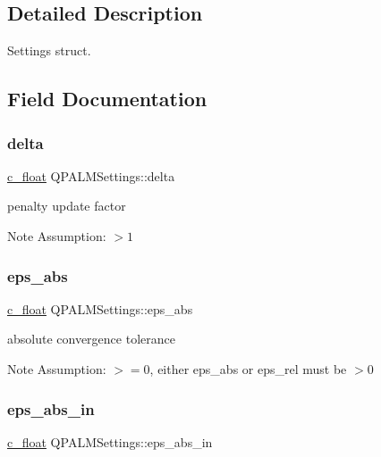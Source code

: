 \subsection{Detailed Description}
Settings struct. 

\subsection{Field Documentation}
\mbox{\label{structQPALMSettings_a1bf9e088b59e076c100ce03da4431181}} 
\subsubsection{\texorpdfstring{delta}{delta}}
{\footnotesize\ttfamily \mbox{\hyperlink{global__opts_8h_a7f1a9fda95e52979658c20a0d134fb15}{c\+\_\+float}} Q\+P\+A\+L\+M\+Settings\+::delta}



penalty update factor 

\begin{DoxyNote}{Note}
Assumption\+: $>1$ 
\end{DoxyNote}
\mbox{\label{structQPALMSettings_adadd5ae5aada22693f708c55678777f4}} 
\subsubsection{\texorpdfstring{eps\_abs}{eps\_abs}}
{\footnotesize\ttfamily \mbox{\hyperlink{global__opts_8h_a7f1a9fda95e52979658c20a0d134fb15}{c\+\_\+float}} Q\+P\+A\+L\+M\+Settings\+::eps\+\_\+abs}



absolute convergence tolerance 

\begin{DoxyNote}{Note}
Assumption\+: $>=0$, either eps\+\_\+abs or eps\+\_\+rel must be $>0$ 
\end{DoxyNote}
\mbox{\label{structQPALMSettings_a0b5e66e45976754edbefb12c9aa6cd4d}} 
\subsubsection{\texorpdfstring{eps\_abs\_in}{eps\_abs\_in}}
{\footnotesize\ttfamily \mbox{\hyperlink{global__opts_8h_a7f1a9fda95e52979658c20a0d134fb15}{c\+\_\+float}} Q\+P\+A\+L\+M\+Settings\+::eps\+\_\+abs\+\_\+in}



